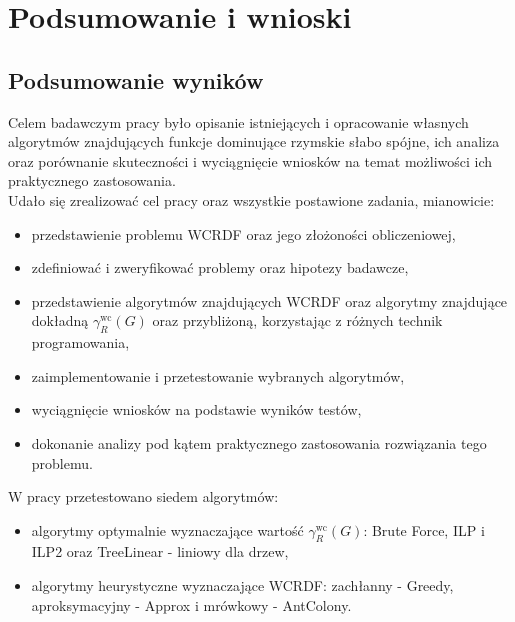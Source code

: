 \chapter{Podsumowanie i wnioski}

\section{Podsumowanie wyników}

Celem badawczym pracy było opisanie istniejących i opracowanie własnych algorytmów znajdujących funkcje dominujące rzymskie słabo spójne, ich analiza oraz porównanie skuteczności i wyciągnięcie wniosków na temat możliwości ich praktycznego zastosowania.\\
Udało się zrealizować cel pracy oraz wszystkie postawione zadania, mianowicie:
\begin{itemize}
    \item przedstawienie problemu WCRDF oraz jego złożoności obliczeniowej,
    \item zdefiniować i zweryfikować problemy oraz hipotezy badawcze,
    \item przedstawienie algorytmów znajdujących WCRDF oraz algorytmy znajdujące dokładną $\gamma^{\text{wc}}_R(G)$ oraz przybliżoną, korzystając z różnych technik programowania,
    \item zaimplementowanie i przetestowanie wybranych algorytmów,
    \item wyciągnięcie wniosków na podstawie wyników testów,
    \item dokonanie analizy pod kątem praktycznego zastosowania rozwiązania tego problemu.
\end{itemize}
W pracy przetestowano siedem algorytmów:
\begin{itemize}
    \item algorytmy optymalnie wyznaczające wartość $\gamma^{\text{wc}}_R(G)$: Brute Force, ILP i ILP2 oraz TreeLinear - liniowy dla drzew,
    \item algorytmy heurystyczne wyznaczające WCRDF: zachłanny - Greedy, aproksymacyjny - Approx i mrówkowy - AntColony.
\end{itemize}

